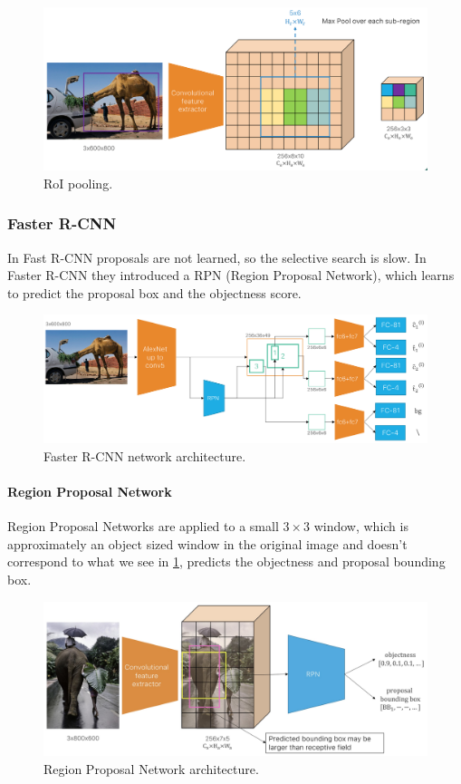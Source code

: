\begin{figure}[htbp]
  \centering
  \includegraphics[width=0.7\linewidth]{./img/roipool.png}
  \caption{RoI pooling.}
\end{figure}

\subsubsection{Faster R-CNN}

In Fast R-CNN proposals are not learned, so the selective search is slow.
In Faster R-CNN they introduced a RPN (Region Proposal Network), which learns to predict the proposal box and the objectness score.

\begin{figure}[htbp]
  \centering
  \includegraphics[width=0.8\linewidth]{./img/fasterrcnn.png}
  \caption{Faster R-CNN network architecture.}
\end{figure}

\paragraph{Region Proposal Network}

Region Proposal Networks are applied to a small $3\times 3$ window, which is approximately an object sized window in the original image and doesn't correspond to what we see in \ref{fig:rpn}, predicts the objectness and proposal bounding box.

\begin{figure}[htbp]
  \centering
  \includegraphics[width=0.7\linewidth]{./img/rpn.jpg}
  \caption{Region Proposal Network architecture.}
  \label{fig:rpn}
\end{figure}

